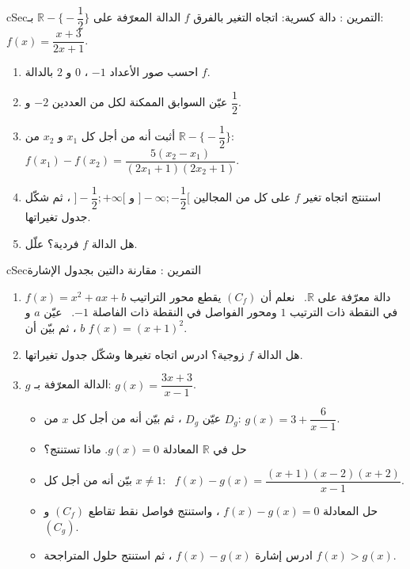 \documentclass[12pt,a4paper]{article}
\newenvironment{BOX}[2]{\begin{otherlanguage}{english}\begin{arbox}{#1}{#2}}{\end{arbox}\end{otherlanguage}}
\newcounter{exo}
\newenvironment{tamrin}[1]{\stepcounter{exo}\begin{BOX}{cSec}{التمرين \theexo: #1}}{\end{BOX}}
\newcommand{\R}{\mathbb{R}}
\newenvironment{sq}{\begin{itemize}[leftmargin=2.4em,itemsep=3pt]}{\end{itemize}}
\newcommand{\qa}{\item[(أ)]}\newcommand{\qb}{\item[(ب)]}\newcommand{\qc}{\item[(جـ)]}\newcommand{\qd}{\item[(د)]}\newcommand{\qe}{\item[(هـ)]}
\begin{document}
\begin{tamrin}{دالة كسرية: اتجاه التغير بالفرق}
$f$ الدالة المعرّفة على $\R-\Big\{-\dfrac12\Big\}$ بـ: $f(x)=\dfrac{x+3}{2x+1}$.
\begin{enumerate}
\item احسب صور الأعداد $-1$ ، $0$ و $2$ بالدالة $f$.
\item عيّن السوابق الممكنة لكل من العددين $-2$ و $\dfrac12$.
\item أثبت أنه من أجل كل $x_1$ و $x_2$ من $\R-\Big\{-\dfrac12\Big\}$: \ $f(x_1)-f(x_2)=\dfrac{5(x_2-x_1)}{(2x_1+1)(2x_2+1)}$.
\item استنتج اتجاه تغير $f$ على كل من المجالين $\Big]-\infty;-\dfrac12\Big[$ و $\Big]-\dfrac12;+\infty\Big[$ ، ثم شكّل جدول تغيراتها.
\item هل الدالة $f$ فردية؟ علّل.
\end{enumerate}
\end{tamrin}

\begin{tamrin}{مقارنة دالتين بجدول الإشارة}
\begin{enumerate}
\item $f(x)=x^2+ax+b$ دالة معرّفة على $\R$. \ نعلم أن $(C_f)$ يقطع محور التراتيب في النقطة ذات الترتيب $1$ ومحور الفواصل في النقطة ذات الفاصلة $-1$. \ عيّن $a$ و $b$ ، ثم بيّن أن $f(x)=(x+1)^2$.
\item هل الدالة $f$ زوجية؟ ادرس اتجاه تغيرها وشكّل جدول تغيراتها.
\item $g$ الدالة المعرّفة بـ: $g(x)=\dfrac{3x+3}{x-1}$.
\begin{sq}
\qa عيّن $D_g$ ، ثم بيّن أنه من أجل كل $x$ من $D_g$: $g(x)=3+\dfrac{6}{x-1}$.
\qb حل في $\R$ المعادلة $g(x)=0$. ماذا تستنتج؟
\qc بيّن أنه من أجل كل $x\ne1$: \ $f(x)-g(x)=\dfrac{(x+1)(x-2)(x+2)}{x-1}$.
\qd حل المعادلة $f(x)-g(x)=0$ ، واستنتج فواصل نقط تقاطع $(C_f)$ و $(C_g)$.
\qe ادرس إشارة $f(x)-g(x)$ ، ثم استنتج حلول المتراجحة $f(x)>g(x)$.
\end{sq}
\end{enumerate}
\end{tamrin}
\end{document}
